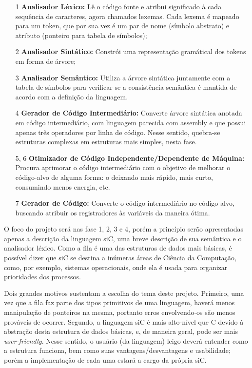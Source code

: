 \documentclass[12pt]{article}
\begin{document}
\begin{itemize}
	\item[1] \textbf{Analisador Léxico:} Lê o código fonte e atribui significado à cada sequência de caracteres, agora chamados lexemas. Cada lexema é mapeado para um token, que por sua vez é um par de nome (símbolo abstrato) e atributo (ponteiro para tabela de símbolos);
	\item[2] \textbf{Analisador Sintático:} Constrói uma representação gramátical dos tokens em forma de árvore;
	\item[3] \textbf{Analisador Semântico:} Utiliza a árvore sintática juntamente com a tabela de símbolos para verificar se a consistência semântica é mantida de acordo com a definição da linguagem.
	\item[4] \textbf{Gerador de Código Intermediário:} Converte árvore sintática anotada em código intermediário, com linguagem parecida com assembly e que possui apenas três operadores por linha de código. Nesse sentido, quebra-se estruturas complexas em estruturas mais simples, nesta fase.
	\item[5, 6] \textbf{Otimizador de Código Independente/Dependente de Máquina:} Procura aprimorar o código intermediário com o objetivo de melhorar o código-alvo de alguma forma: o deixando mais rápido, mais curto, consumindo menos energia, etc.
	\item[7] \textbf{Gerador de Código:} Converte o código intermediário no código-alvo, 	buscando atribuir os registradores às variáveis da maneira ótima.
\end{itemize}

\indent O foco do projeto será nas fase 1, 2, 3 e 4, porém a princípio serão apresentadas apenas a descrição da linguagem siC, uma breve descrição de sua semântica e o analisador léxico. Como a fila é uma das estruturas de dados mais básicas, é possível dizer que siC se destina a inúmeras áreas de Ciência da Computação, como, por exemplo, sistemas operacionais, onde ela é usada para organizar prioridades dos processos.

\indent Dois grandes motivos sustentam a escolha do tema deste projeto. Primeiro, uma vez que a fila faz parte dos tipos primitivos de uma linguagem, haverá menos manipulação de ponteiros na mesma, portanto erros envolvendo-os são menos prováveis de ocorrer. Segundo, a linguagem siC é mais alto-nível que C devido à abstração desta estrutura de dados básicas, e, de maneira geral, pode ser mais \textit{user-friendly}. Nesse sentido, o usuário (da linguagem) leigo deverá entender como a estrutura funciona, bem como suas vantagens/desvantagens e usabilidade; porém a implementação de cada uma estará a cargo da própria siC. 
\end{document}

